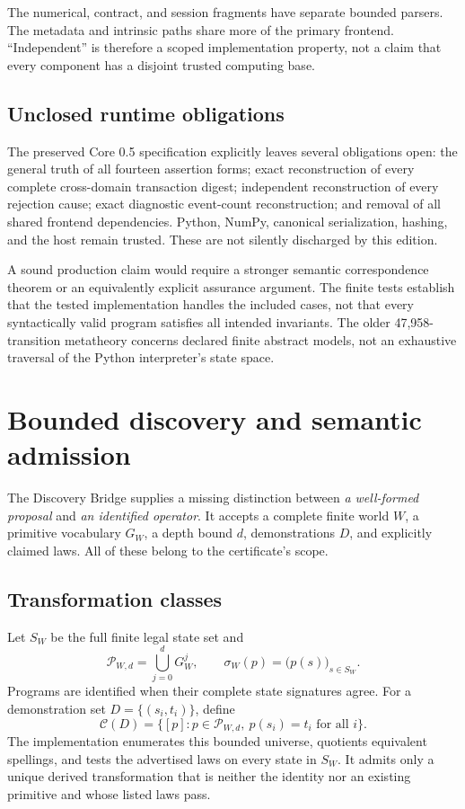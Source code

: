 \documentclass[11pt]{article}
\begin{document}
The numerical, contract, and session fragments have separate bounded parsers. The metadata and intrinsic paths share more of the primary frontend. ``Independent'' is therefore a scoped implementation property, not a claim that every component has a disjoint trusted computing base.

\subsection{Unclosed runtime obligations}
The preserved Core 0.5 specification explicitly leaves several obligations open: the general truth of all fourteen assertion forms; exact reconstruction of every complete cross-domain transaction digest; independent reconstruction of every rejection cause; exact diagnostic event-count reconstruction; and removal of all shared frontend dependencies. Python, NumPy, canonical serialization, hashing, and the host remain trusted. These are not silently discharged by this edition. \cite{o05}

A sound production claim would require a stronger semantic correspondence theorem or an equivalently explicit assurance argument. The finite tests establish that the tested implementation handles the included cases, not that every syntactically valid program satisfies all intended invariants. The older 47,958-transition metatheory concerns declared finite abstract models, not an exhaustive traversal of the Python interpreter's state space. \cite{o03}

\section{Bounded discovery and semantic admission}
The Discovery Bridge supplies a missing distinction between \emph{a well-formed proposal} and \emph{an identified operator}. It accepts a complete finite world \(W\), a primitive vocabulary \(G_W\), a depth bound \(d\), demonstrations \(D\), and explicitly claimed laws. All of these belong to the certificate's scope. \cite{odb}

\subsection{Transformation classes}
Let \(S_W\) be the full finite legal state set and
\[
 \mathcal P_{W,d}=\bigcup_{j=0}^{d}G_W^j,
 \qquad \sigma_W(p)=\bigl(p(s)\bigr)_{s\in S_W}.
\]
Programs are identified when their complete state signatures agree. For a demonstration set \(D=\{(s_i,t_i)\}\), define
\[
 \mathcal C(D)=\{[p]:p\in\mathcal P_{W,d},\ p(s_i)=t_i\text{ for all }i\}.
\]
The implementation enumerates this bounded universe, quotients equivalent spellings, and tests the advertised laws on every state in \(S_W\). It admits only a unique derived transformation that is neither the identity nor an existing primitive and whose listed laws pass.
\end{document}
